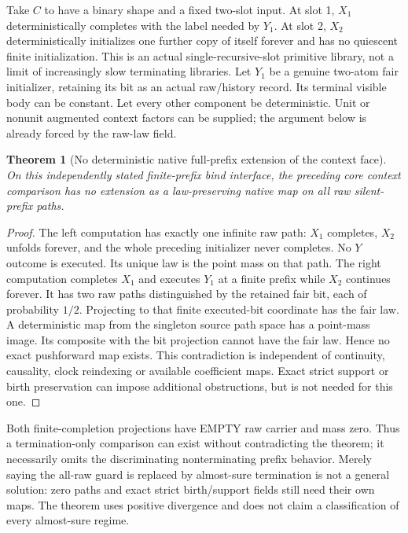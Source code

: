 \documentclass[11pt]{article}
\newtheorem{theorem}{Theorem}\newtheorem{proposition}{Proposition}\newtheorem{lemma}{Lemma}
\begin{document}
Take $C$ to have a binary shape and a fixed two-slot input. At slot 1, $X_1$ deterministically completes with the label needed by $Y_1$. At slot 2, $X_2$ deterministically initializes one further copy of itself forever and has no quiescent finite initialization. This is an actual single-recursive-slot primitive library, not a limit of increasingly slow terminating libraries. Let $Y_1$ be a genuine two-atom fair initializer, retaining its bit as an actual raw/history record. Its terminal visible body can be constant. Let every other component be deterministic. Unit or nonunit augmented context factors can be supplied; the argument below is already forced by the raw-law field.

\begin{theorem}[No deterministic native full-prefix extension of the context face]
On this independently stated finite-prefix bind interface, the preceding core context comparison has no extension as a law-preserving native map on all raw silent-prefix paths.
\end{theorem}
\begin{proof}
The left computation has exactly one infinite raw path: $X_1$ completes, $X_2$ unfolds forever, and the whole preceding initializer never completes. No $Y$ outcome is executed. Its unique law is the point mass on that path. The right computation completes $X_1$ and executes $Y_1$ at a finite prefix while $X_2$ continues forever. It has two raw paths distinguished by the retained fair bit, each of probability $1/2$. Projecting to that finite executed-bit coordinate has the fair law. A deterministic map from the singleton source path space has a point-mass image. Its composite with the bit projection cannot have the fair law. Hence no exact pushforward map exists. This contradiction is independent of continuity, causality, clock reindexing or available coefficient maps. Exact strict support or birth preservation can impose additional obstructions, but is not needed for this one.\end{proof}

Both finite-completion projections have EMPTY raw carrier and mass zero. Thus a termination-only comparison can exist without contradicting the theorem; it necessarily omits the discriminating nonterminating prefix behavior. Merely saying the all-raw guard is replaced by almost-sure termination is not a general solution: zero paths and exact strict birth/support fields still need their own maps. The theorem uses positive divergence and does not claim a classification of every almost-sure regime.
\end{document}
